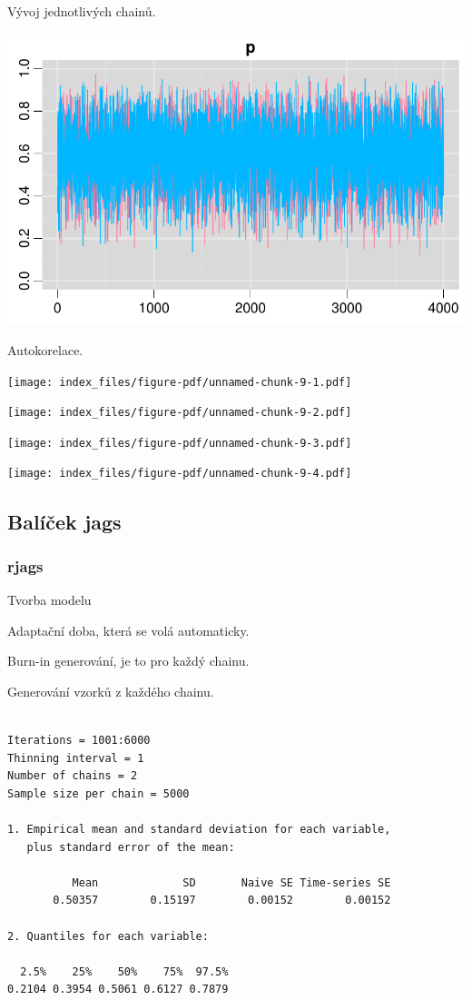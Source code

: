 \documentclass[
  11pt,
  a4paper]{report}
\begin{document}
Vývoj jednotlivých chainů.

\includegraphics{index_files/figure-pdf/unnamed-chunk-8-1.pdf}

Autokorelace.

\texttt{[image: index\_files/figure-pdf/unnamed-chunk-9-1.pdf]}

\texttt{[image: index\_files/figure-pdf/unnamed-chunk-9-2.pdf]}

\texttt{[image: index\_files/figure-pdf/unnamed-chunk-9-3.pdf]}

\texttt{[image: index\_files/figure-pdf/unnamed-chunk-9-4.pdf]}

\subsection{Balíček jags}\label{baluxedux10dek-jags}

\subsubsection{rjags}\label{rjags}

Tvorba modelu

Adaptační doba, která se volá automaticky.

Burn-in generování, je to pro každý chainu.

Generování vzorků z každého chainu.

\begin{verbatim}

Iterations = 1001:6000
Thinning interval = 1 
Number of chains = 2 
Sample size per chain = 5000 

1. Empirical mean and standard deviation for each variable,
   plus standard error of the mean:

          Mean             SD       Naive SE Time-series SE 
       0.50357        0.15197        0.00152        0.00152 

2. Quantiles for each variable:

  2.5%    25%    50%    75%  97.5% 
0.2104 0.3954 0.5061 0.6127 0.7879 
\end{verbatim}
\end{document}

